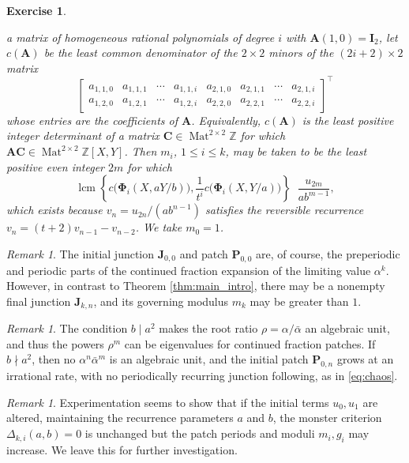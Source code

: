 \documentclass{article}
\numberwithin{equation}{section}
\newtheorem{exer}[thm]{Exercise}
\theoremstyle{definition}
\theoremstyle{remark}
\newtheorem{rem}[thm]{Remark}
\DeclareMathOperator{\lcm}{lcm}
\DeclareMathOperator{\Mat}{Mat}
\newcommand{\ZZ}{\mathbb{Z}}
\newcommand{\<}{\left\langle}
\renewcommand{\>}{\right\rangle}
\begin{document}
\begin{exer}
\begin{enumerate}[label=\textup{(\alph*)}]
\[    \]
    a matrix of homogeneous rational polynomials of degree $i$ with $\mathbf{A}(1,0) = \mathbf{I}_2$, let $c (\mathbf{A})$ be the least common denominator of the $2 \times 2$ minors of the $(2i + 2) \times 2$ matrix
    \[
      \begin{bmatrix}
        a_{1,1,0} & a_{1,1,1} & \cdots & a_{1,1,i} & a_{2,1,0} & a_{2,1,1} & \cdots & a_{2,1,i} \\
        a_{1,2,0} & a_{1,2,1} & \cdots & a_{1,2,i} & a_{2,2,0} & a_{2,2,1} & \cdots & a_{2,2,i}
      \end{bmatrix}^\top
    \]
    whose entries are the coefficients of $\mathbf{A}$. Equivalently, $c(\mathbf{A})$ is the least positive integer determinant of a matrix $\mathbf{C} \in \Mat^{2\times 2}\ZZ$ for which $\mathbf{A}\mathbf{C} \in \Mat^{2\times 2}\ZZ[X,Y]$. Then $m_i$, $1 \leq i \leq k$, may be taken to be the least positive even integer $2m$ for which
    \[
      \lcm \left\{c\big(\boldsymbol{\Phi}_i(X, a Y/b)\big), \frac{1}{t^i} c\big(\boldsymbol{\Phi}_i(X, Y/a)\big)\right\} \mathop{\Bigg\vert} \frac{u_{2m}}{ab^{m-1}},
    \]
    which exists because $v_n = u_{2n}/(ab^{n-1})$ satisfies the reversible recurrence $v_n = (t + 2)v_{n-1} - v_{n-2}$. We take $m_0 = 1$.
  \end{enumerate}
\end{exer}

\begin{rem}
  The initial junction $\mathbf{J}_{0,0}$ and patch $\mathbf{P}_{0,0}$ are, of course, the preperiodic and periodic parts of the continued fraction expansion of the limiting value $\alpha^k$. However, in contrast to Theorem \ref{thm:main_intro}, there may be a nonempty final junction $\mathbf{J}_{k,n}$, and its governing modulus $m_k$ may be greater than $1$.
\end{rem}
\begin{rem}
  The condition $b \mid a^2$ makes the root ratio $\rho = \alpha/\bar\alpha$ an algebraic unit, and thus the powers $\rho^m$ can be eigenvalues for continued fraction patches. If $b \nmid a^2$, then no $\alpha^n\bar\alpha^m$ is an algebraic unit, and the initial patch $\mathbf{P}_{0,n}$ grows at an irrational rate, with no periodically recurring junction following, as in \eqref{eq:chaos}.
\end{rem}
\begin{rem}
  Experimentation seems to show that if the initial terms $u_0, u_1$ are altered, maintaining the recurrence parameters $a$ and $b$, the monster criterion $\Delta_{k,i}(a, b) = 0$ is unchanged but the patch periods and moduli $m_i, g_i$ may increase. We leave this for further investigation.
\end{rem}
\end{document}
